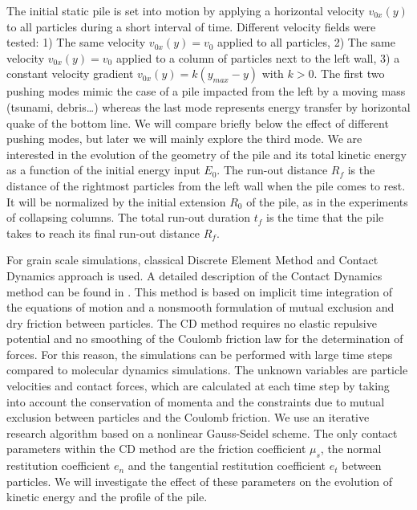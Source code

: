 The initial static pile is set into motion by applying a horizontal velocity 
$v_{0x}(y)$ to all particles during a short interval of time. Different 
velocity fields were tested: 1) The same velocity $v_{0x}(y) = v_0$ applied to 
all particles, 2) The same velocity $v_{0x}(y) = v_0$ applied to a column of 
particles next to the left wall, 3) a constant velocity gradient  $v_{0x}(y) = 
k (y_{max} - y)$ with $k>0$. The first two pushing modes mimic the case of a 
pile impacted from the left by a moving mass (tsunami, debris\dots) whereas the 
last mode represents energy transfer by horizontal quake of the bottom line. We 
will compare briefly below the effect of different pushing modes, but later we 
will mainly explore the third mode. We are interested in the evolution of the 
geometry of the pile and its total kinetic energy as a function of the initial 
energy input $E_0$. The run-out distance $R_f$ is the distance of the rightmost 
particles from the left wall when the pile comes to rest.  
It will be normalized by the initial extension $R_0$ of the pile, as in 
the experiments of collapsing columns. The total run-out duration $t_f$ is the 
time that the pile takes to reach its final run-out distance $R_f$.       

For grain scale simulations, classical Discrete Element Method and Contact 
Dynamics approach is used. 
A detailed description of the Contact Dynamics 
method can be found in \cite{Moreau1993,Jean1999,Radjai2009,Radjai2011}. 
This method is based on implicit time integration of the equations of motion 
and a nonsmooth formulation of mutual exclusion and dry friction between 
particles. The CD method requires no elastic repulsive potential and no 
smoothing of the Coulomb friction law for the determination of forces. 
For this reason, the simulations can be performed with large time steps 
compared to molecular dynamics simulations. The unknown variables are particle 
velocities and contact forces, which are calculated at each time step by taking 
into account the conservation of momenta and the constraints due to mutual 
exclusion between particles and the Coulomb friction. We use an iterative 
research algorithm based on a nonlinear Gauss-Seidel scheme. The only contact 
parameters within the CD method are the friction coefficient $\mu_s$, the 
normal restitution coefficient $e_n$ and the tangential restitution coefficient 
$e_t$ between particles. We will investigate the effect of these parameters on 
the evolution of kinetic energy and the profile of the pile.     
  
